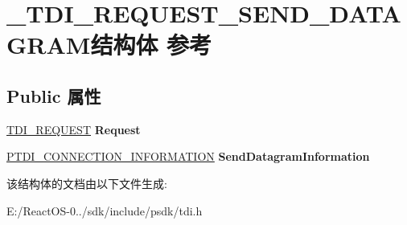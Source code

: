 \hypertarget{struct___t_d_i___r_e_q_u_e_s_t___s_e_n_d___d_a_t_a_g_r_a_m}{}\section{\+\_\+\+T\+D\+I\+\_\+\+R\+E\+Q\+U\+E\+S\+T\+\_\+\+S\+E\+N\+D\+\_\+\+D\+A\+T\+A\+G\+R\+A\+M结构体 参考}
\label{struct___t_d_i___r_e_q_u_e_s_t___s_e_n_d___d_a_t_a_g_r_a_m}
\subsection*{Public 属性}
\begin{DoxyCompactItemize}
\item 
\mbox{\label{struct___t_d_i___r_e_q_u_e_s_t___s_e_n_d___d_a_t_a_g_r_a_m_a83aaae836e6222165feb0a8089b65e4d}} 
\hyperlink{struct___t_d_i___r_e_q_u_e_s_t}{T\+D\+I\+\_\+\+R\+E\+Q\+U\+E\+ST} {\bfseries Request}
\item 
\mbox{\label{struct___t_d_i___r_e_q_u_e_s_t___s_e_n_d___d_a_t_a_g_r_a_m_a5ddc5806ad671b4f737f1efa663cb716}} 
\hyperlink{struct___t_d_i___c_o_n_n_e_c_t_i_o_n___i_n_f_o_r_m_a_t_i_o_n}{P\+T\+D\+I\+\_\+\+C\+O\+N\+N\+E\+C\+T\+I\+O\+N\+\_\+\+I\+N\+F\+O\+R\+M\+A\+T\+I\+ON} {\bfseries Send\+Datagram\+Information}
\end{DoxyCompactItemize}


该结构体的文档由以下文件生成\+:\begin{DoxyCompactItemize}
\item 
E\+:/\+React\+O\+S-\/0../sdk/include/psdk/tdi.\+h\end{DoxyCompactItemize}

